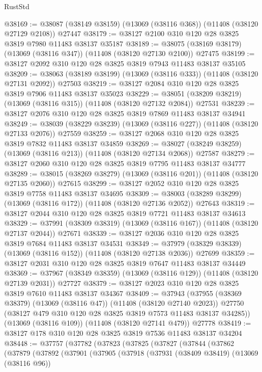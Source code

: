 \begin{lexlean}{RustStd}
\begin{coremodule}
@38169 := @38087 (@38149 @38159) (@13069 (@38116 @368)) (@11408 (@38120 @27129 @2108)) @27447
@38179 := @38127 @2100 @310 @120 @28 @3825 @3819 @7980 @11483 @38137 @35187
@38189 := @38075 (@38169 @38179) (@13069 (@38116 @347)) (@11408 (@38120 @27130 @2100)) @27475
@38199 := @38127 @2092 @310 @120 @28 @3825 @3819 @7943 @11483 @38137 @35105
@38209 := @38063 (@38189 @38199) (@13069 (@38116 @333)) (@11408 (@38120 @27131 @2092)) @27503
@38219 := @38127 @2084 @310 @120 @28 @3825 @3819 @7906 @11483 @38137 @35023
@38229 := @38051 (@38209 @38219) (@13069 (@38116 @315)) (@11408 (@38120 @27132 @2084)) @27531
@38239 := @38127 @2076 @310 @120 @28 @3825 @3819 @7869 @11483 @38137 @34941
@38249 := @38039 (@38229 @38239) (@13069 (@38116 @227)) (@11408 (@38120 @27133 @2076)) @27559
@38259 := @38127 @2068 @310 @120 @28 @3825 @3819 @7832 @11483 @38137 @34859
@38269 := @38027 (@38249 @38259) (@13069 (@38116 @213)) (@11408 (@38120 @27134 @2068)) @27587
@38279 := @38127 @2060 @310 @120 @28 @3825 @3819 @7795 @11483 @38137 @34777
@38289 := @38015 (@38269 @38279) (@13069 (@38116 @201)) (@11408 (@38120 @27135 @2060)) @27615
@38299 := @38127 @2052 @310 @120 @28 @3825 @3819 @7758 @11483 @38137 @34695
@38309 := @38003 (@38289 @38299) (@13069 (@38116 @172)) (@11408 (@38120 @27136 @2052)) @27643
@38319 := @38127 @2044 @310 @120 @28 @3825 @3819 @7721 @11483 @38137 @34613
@38329 := @37991 (@38309 @38319) (@13069 (@38116 @167)) (@11408 (@38120 @27137 @2044)) @27671
@38339 := @38127 @2036 @310 @120 @28 @3825 @3819 @7684 @11483 @38137 @34531
@38349 := @37979 (@38329 @38339) (@13069 (@38116 @152)) (@11408 (@38120 @27138 @2036)) @27699
@38359 := @38127 @2031 @310 @120 @28 @3825 @3819 @7647 @11483 @38137 @34449
@38369 := @37967 (@38349 @38359) (@13069 (@38116 @129)) (@11408 (@38120 @27139 @2031)) @27727
@38379 := @38127 @2023 @310 @120 @28 @3825 @3819 @7610 @11483 @38137 @34367
@38409 := @37943
    (@37955
      (@38369 @38379)
      (@13069 (@38116 @47))
      (@11408 (@38120 @27140 @2023))
      @27750
      (@38127 @479 @310 @120 @28 @3825 @3819 @7573 @11483 @38137 @34285))
    (@13069 (@38116 @109))
    (@11408 (@38120 @27141 @479))
    @27778
@38419 := @38127 @178 @310 @120 @28 @3825 @3819 @7536 @11483 @38137 @34204
@38448 := @37757
    (@37782
      (@37823
        (@37825
          (@37827
            (@37844
              (@37862
                (@37879
                  (@37892
                    (@37901
                      (@37905
                        (@37918
                          (@37931
                            (@38409 @38419)
                            (@13069 (@38116 @96))

\end{coremodule}
\end{lexlean}
